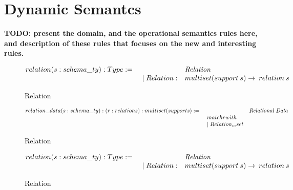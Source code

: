 \section{Dynamic Semantcs}
\label{sec:semantics}

{\bf TODO: present the domain, and the operational semantics rules here, 
and description of these rules that focuses on the new and interesting rules.}

\begin{figure}
\begin{center}
$\begin{array}{@{}l@{~}l@{\quad}l@{\!\!\!\!\!\!}r}
relation (s: schema\_ty): Type := & \ \ \ \ \ & \emph{Relation} \\
& \quad \mid Relation: & multiset(support \:s) \rightarrow \: relation \:s\\
\end{array}
$
\end{center}
\caption{Relation}
\label{fig-relation}
\end{figure}

\begin{figure}
\begin{center}
$\begin{array}{@{}l@{~}l@{\quad}l@{\!\!\!\!\!\!}r}
relation\_data (s: schema\_ty): (r: relation s) : multiset(support s) := & \ \ \ \ \ & \emph{Relational Data} \\
& \quad match r with\\
& \quad \mid Relation_mset 
\end{array}
$
\end{center}
\caption{Relation}
\label{fig-relation}
\end{figure}

\begin{figure}
\begin{center}
$\begin{array}{@{}l@{~}l@{\quad}l@{\!\!\!\!\!\!}r}
relation (s: schema\_ty): Type := & \ \ \ \ \ & \emph{Relation} \\
& \quad \mid Relation: & multiset(support \:s) \rightarrow \: relation \:s\\
\end{array}
$
\end{center}
\caption{Relation}
\label{fig-relation}
\end{figure}